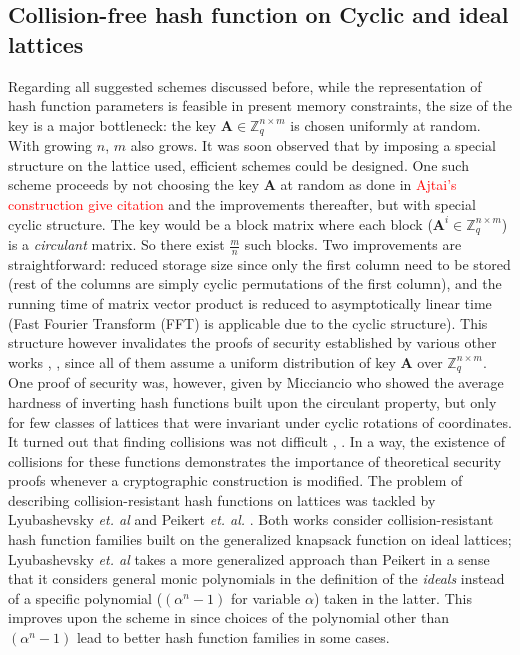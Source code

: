\documentclass[10pt]{elsarticle}
\begin{document}
\subsection{Collision-free hash function on Cyclic and ideal lattices}
Regarding all suggested schemes discussed before, while the
representation of hash function parameters is feasible in present
memory constraints, the size of the key is a major bottleneck: the
key $\mathbf{A} \in\mathbb{Z}_{q}^{n\times m}$ is chosen uniformly
at random. With growing $n$, $m$ also grows. It was soon observed
that by imposing a special structure on the lattice used, efficient
schemes could be designed. One such scheme proceeds by not choosing
the key $\mathbf{A}$ at random as done in \textcolor{red}{Ajtai's
construction \cite{} give citation} and the improvements thereafter,
but with special cyclic structure. The key would be a block matrix
where each block ($\mathbf{A}^{i}\in\mathbb{Z}_{q}^{n\times m}$) is
a \textit{circulant} matrix. So there exist $\frac{m}{n}$ such
blocks. Two improvements are straightforward: reduced storage size
since only the first column need to be stored (rest of the columns
are simply cyclic permutations of the first column), and the running
time of matrix vector product is reduced to asymptotically linear
time (Fast Fourier Transform (FFT) is applicable due to the cyclic
structure). This structure however invalidates the proofs of
security established by various other works \cite{CRHF_Cai1997},
\cite{CRHF_Micciancio2002}, \cite{CRHF_Micciancio2004} since all of
them assume a uniform distribution of key $\mathbf{A}$ over
$\mathbb{Z}_{q}^{n\times m}$. One proof of security was, however,
given by Micciancio \cite{CRHF_Micciancio2002_compact_knapsacks} who
showed the average hardness of inverting hash functions built upon
the circulant property, but only for few classes of lattices that
were invariant under cyclic rotations of coordinates. It turned out
that finding collisions was not difficult
\cite{CRHF_Lyubashevsky2006}, \cite{CRHF_Peikert2006}. In a way, the
existence of collisions for these functions demonstrates the
importance of theoretical security proofs whenever a cryptographic
construction is modified. The problem of describing
collision-resistant hash functions on lattices was tackled by
Lyubashevsky \textit{et. al} \cite{CRHF_Lyubashevsky2006} and
Peikert \textit{et. al.} \cite{CRHF_Peikert2006}. Both works
\cite{CRHF_Lyubashevsky2006, CRHF_Peikert2006} consider
collision-resistant hash function families built on the generalized
knapsack function on ideal lattices; Lyubashevsky \textit{et. al}
\cite{CRHF_Lyubashevsky2006} takes a more generalized approach than
Peikert \cite{CRHF_Peikert2006} in a sense that it considers general
monic polynomials in the definition of the \textit{ideals} instead
of a specific polynomial ($(\alpha^{n} - 1)$ for variable $\alpha$)
taken in the latter. This improves upon the scheme in
\cite{CRHF_Peikert2006} since choices of the polynomial other than
$(\alpha^{n} - 1)$ lead to better hash function families in some
cases.
\end{document}
